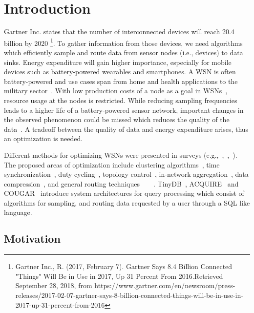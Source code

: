 \section{Introduction}
\label{sec:Introduction}
Gartner Inc. states that the number of interconnected devices will reach 20.4
billion by 2020 \footnote{Gartner Inc., R. (2017, February 7). Gartner Says 8.4
Billion Connected "Things" Will Be in Use in 2017, Up 31 Percent From
2016.Retrieved September 28, 2018, from
https://www.gartner.com/en/newsroom/press-releases/2017-02-07-gartner-says-8-billion-connected-things-will-be-in-use-in-2017-up-31-percent-from-2016}.
To gather information from those devices, we need algorithms which efficiently
sample and route data from sensor nodes (i.e., devices) to data sinks. Energy
expenditure will gain higher importance, especially for mobile devices such as
battery-powered wearables and smartphones. A \ac{WSN} is often battery-powered
and use cases span from home and health applications to the military
sector~\cite{akyildiz2002wireless}. With low production costs of a node as a
goal in \acp{WSN}~\cite{akyildiz2002wireless}, resource usage at the nodes is
restricted. While reducing sampling frequencies leads to a higher life of a
battery-powered sensor network, important changes in the observed phenomenon
could be missed which reduces the quality of the
data~\cite{akyildiz2002wireless}. A tradeoff between the quality of data and
energy expenditure arises, thus an optimization is needed. 
\par
Different methods for optimizing \acp{WSN} were presented in surveys
(e.g.,~\cite{abbasi2007survey},~\cite{sivrikaya2004time},~\cite{carrano2014survey}).
The proposed areas of optimization include clustering
algorithms~\cite{abbasi2007survey}, time
synchronization~\cite{sivrikaya2004time}, duty
cycling~\cite{carrano2014survey}, topology control~\cite{li2013survey},
in-network aggregation~\cite{fasolo2007network}, data
compression~\cite{srisooksai2012practical}, and general routing
techniques~\cite{al2004routing}~\cite{kulkarni2011particle}~\cite{singh2015survey}~\cite{rault2014energy}.
TinyDB~\cite{madden2005tinydb}, ACQUIRE~\cite{sadagopan2003acquire} and
COUGAR~\cite{yao2002cougar} introduce system architectures for query processing
which consist of algorithms for sampling, and routing data requested by a user
through a \ac{SQL} like language.


\subsection{Motivation}
\label{sec:motivation}

